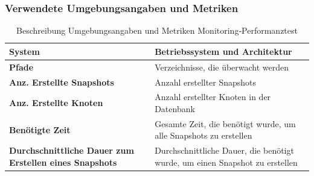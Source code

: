\documentclass[a4paper,12pt]{report}
\begin{document}
    \subsubsection{Verwendete Umgebungsangaben und Metriken}\label{subsubsec:monitoring-perftest-metrics-title}
    \begin{table}[h!]
        \centering
        \setlength{\leftmargini}{0.8cm}
        \begin{tabular}{|p{7cm}|p{7cm}|}
            \hline
            \textbf{System}                                                & Betriebssystem und Architektur                                              \\ \hline
            \textbf{Pfade}                                                 & Verzeichnisse, die überwacht werden                                         \\ \hline
            \textbf{Anz. Erstellte Snapshots}                              & Anzahl erstellter Snapshots                                                 \\ \hline
            \textbf{Anz. Erstellte Knoten}                                 & Anzahl erstellter Knoten in der Datenbank                                   \\ \hline
            \textbf{Benötigte Zeit}                                        & Gesamte Zeit, die benötigt wurde, um alle Snapshots zu erstellen            \\ \hline
            \textbf{Durchschnittliche Dauer zum Erstellen eines Snapshots} & Durchschnittliche Dauer, die benötigt wurde, um einen Snapshot zu erstellen \\ \hline
        \end{tabular}
        \caption{Beschreibung Umgebungsangaben und Metriken Monitoring-Performanztest}\label{tab:monitoring-perftest-metrics}
    \end{table}
\end{document}
